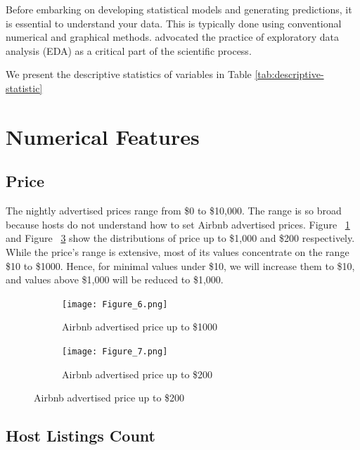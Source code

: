 Before embarking on developing statistical models and generating predictions, it
is essential to understand your data. This is typically done using conventional
numerical and graphical methods. \textcite{tukey1977exploratory} advocated the practice
of exploratory data analysis (EDA) as a critical part of the scientific process.

We present the descriptive statistics of variables in Table
\ref{tab:descriptive-statistic}

\section{Numerical Features}
\label{sec:numerical_features}
\subsection{Price}
The nightly advertised prices range from \$0 to \$10,000. The range is so broad
because hosts do not understand how to set Airbnb advertised prices.  Figure
~\ref{fig:price-distribution-1000} and Figure ~\ref{fig:price-distribution-200}
 show the distributions of price up to \$1,000 and \$200 respectively. While the
price's range is extensive, most of its values concentrate on the range \$10 to
\$1000.  Hence, for minimal values under \$10, we will increase them to \$10,
and values above \$1,000 will be reduced to \$1,000.
\begin{figure}[H]
    \begin{center}

    \caption{Price Distribution}
    \begin{subfigure}[b]{0.48\textwidth}
        \centering
        \caption{Airbnb advertised price up to \$1000}
        \texttt{[image: Figure\_6.png]}
        \label{fig:price-distribution-1000}
    \end{subfigure}
    \begin{subfigure}[b]{0.48\textwidth}
        \centering
        \caption{Airbnb advertised price up to \$200}
        \texttt{[image: Figure\_7.png]}
        \label{fig:price-distribution-200}
    \end{subfigure}

    \end{center}
\end{figure}

\subsection{Host Listings Count}

